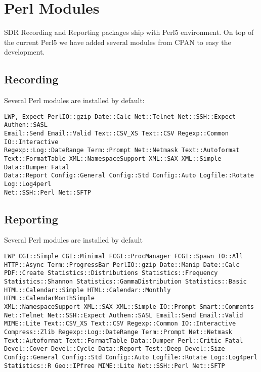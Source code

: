 
\chapter{Perl Modules}

SDR Recording and Reporting packages ship with Perl5 environment.
On top of the current Perl5 we have added several modules from
CPAN to easy the development.

\section*{Recording}
Several Perl modules are installed by default:
\begin{verbatim}
LWP, Expect PerlIO::gzip Date::Calc Net::Telnet Net::SSH::Expect Authen::SASL 
Email::Send Email::Valid Text::CSV_XS Text::CSV Regexp::Common IO::Interactive
Regexp::Log::DateRange Term::Prompt Net::Netmask Text::Autoformat 
Text::FormatTable XML::NamespaceSupport XML::SAX XML::Simple Data::Dumper Fatal 
Data::Report Config::General Config::Std Config::Auto Logfile::Rotate Log::Log4perl 
Net::SSH::Perl Net::SFTP
\end{verbatim}


\section*{Reporting}
Several Perl modules are installed by default

\begin{verbatim}
LWP CGI::Simple CGI::Minimal FCGI::ProcManager FCGI::Spawn IO::All
HTTP::Async Term::ProgressBar PerlIO::gzip Date::Manip Date::Calc
PDF::Create Statistics::Distributions Statistics::Frequency
Statistics::Shannon Statistics::GammaDistribution Statistics::Basic
HTML::Calendar::Simple HTML::Calendar::Monthly HTML::CalendarMonthSimple
XML::NamespaceSupport XML::SAX XML::Simple IO::Prompt Smart::Comments
Net::Telnet Net::SSH::Expect Authen::SASL Email::Send Email::Valid
MIME::Lite Text::CSV_XS Text::CSV Regexp::Common IO::Interactive
Compress::Zlib Regexp::Log::DateRange Term::Prompt Net::Netmask
Text::Autoformat Text::FormatTable Data::Dumper Perl::Critic Fatal
Devel::Cover Devel::Cycle Data::Report Test::Deep Devel::Size
Config::General Config::Std Config::Auto Logfile::Rotate Log::Log4perl
Statistics::R Geo::IPfree MIME::Lite Net::SSH::Perl Net::SFTP
\end{verbatim}

\endinput
